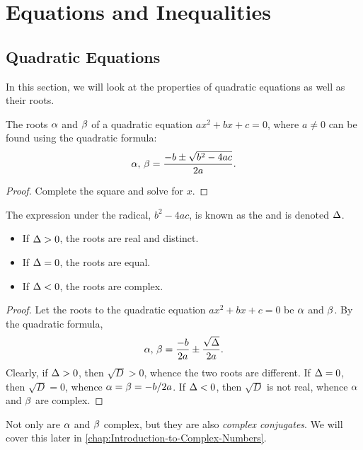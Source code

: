 \chapter{Equations and Inequalities}\label{chap:Equations-and-Inequalities}

\section{Quadratic Equations}

In this section, we will look at the properties of quadratic equations as well as their roots.

\begin{proposition}
    The roots $\alpha$ and $\beta$ of a quadratic equation $ax^2 + bx + c = 0$, where $a \neq 0$ can be found using the quadratic formula: \[\alpha, \, \beta = \frac{-b \pm \sqrt{b^2 - 4ac}}{2a}.\]
\end{proposition}
\begin{proof}
    Complete the square and solve for $x$.
\end{proof}

\begin{definition}
    The expression under the radical, $b^2 - 4ac$, is known as the  and is denoted $\Delta$.
\end{definition}

\begin{proposition}
    \phantom{.}
    \begin{itemize}
        \item If $\Delta > 0$, the roots are real and distinct.
        \item If $\Delta = 0$, the roots are equal.
        \item If $\Delta < 0$, the roots are complex.
    \end{itemize}
\end{proposition}
\begin{proof}
    Let the roots to the quadratic equation $ax^2 + bx + c = 0$ be $\alpha$ and $\beta$. By the quadratic formula, \[\alpha, \, \beta = \frac{-b}{2a} \pm \frac{\sqrt{\Delta}}{2a}.\] Clearly, if $\Delta > 0$, then $\sqrt{D} > 0$, whence the two roots are different. If $\Delta = 0$, then $\sqrt{D} = 0$, whence $\alpha = \beta = -b/2a$. If $\Delta < 0$, then $\sqrt{D}$ is not real, whence $\alpha$ and $\beta$ are complex.
\end{proof}

\begin{remark}
    Not only are $\alpha$ and $\beta$ complex, but they are also \emph{complex conjugates}. We will cover this later in \SS\ref{chap:Introduction-to-Complex-Numbers}.
\end{remark}

